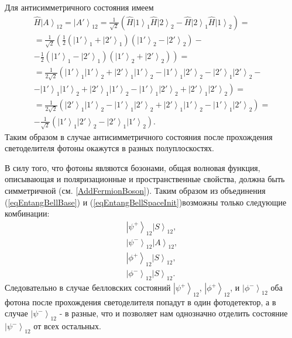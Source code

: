 Для антисимметричного состояния имеем
\begin{eqnarray}
\hat{H}\left|A\right>_{12} = \left|A'\right>_{12} = 
\frac{1}{\sqrt{2}}
\left(
\hat{H}\left|1\right>_1\hat{H}\left|2\right>_2 -
\hat{H}\left|2\right>_1\hat{H}\left|1\right>_2
\right) = 
\nonumber \\
=
\frac{1}{\sqrt{2}}
\left(
\frac{1}{2}
\left(\left|1'\right>_1 +
\left|2'\right>_1\right)
\left(\left|1'\right>_2 -
\left|2'\right>_2\right) -
\right.
\nonumber \\
- \left.
\frac{1}{2}
\left(\left|1'\right>_1 -
\left|2'\right>_1\right)
\left(\left|1'\right>_2 +
\left|2'\right>_2\right)
\right) = 
\nonumber \\
=
\frac{1}{2 \sqrt{2}}
\left(
\left|1'\right>_1 \left|1'\right>_2 +
\left|2'\right>_1 \left|1'\right>_2 -
\left|1'\right>_1 \left|2'\right>_2 -
\left|2'\right>_1 \left|2'\right>_2 -
\right. 
\nonumber \\
- \left.
\left|1'\right>_1 \left|1'\right>_2 +
\left|2'\right>_1 \left|1'\right>_2 -
\left|1'\right>_1 \left|2'\right>_2 +
\left|2'\right>_1 \left|2'\right>_2
\right) =
\nonumber \\
=
\frac{1}{2 \sqrt{2}}
\left(
\left|2'\right>_1 \left|1'\right>_2 
- \left|1'\right>_1 \left|2'\right>_2 
+ \left|2'\right>_1 \left|1'\right>_2 
- \left|1'\right>_1 \left|2'\right>_2
\right) = 
\nonumber \\
- \frac{1}{\sqrt{2}}
\left(
\left|1'\right>_1 \left|2'\right>_2 
- \left|2'\right>_1 \left|1'\right>_2 
\right).
\nonumber
\end{eqnarray}
Таким образом в случае антисимметричного состояния после прохождения
светоделителя фотоны окажутся в разных полуплоскостях.

В силу того, что фотоны являются бозонами, общая волновая функция,
описывающая и поляризационные и пространственные свойства,
должна быть симметричной \cite{bFeinman}
(см. \autoref{AddFermionBoson}). Таким образом из объединения 
(\ref{eqEntangBellBase}) и (\ref{eqEntangBellSpaceInit})возможны
только следующие комбинации:
\begin{eqnarray}
\left|\psi^{+}\right>_{12}\left|S\right>_{12},
\nonumber \\ 
\left|\psi^{-}\right>_{12}\left|A\right>_{12}, 
\nonumber \\ 
\left|\phi^{+}\right>_{12}\left|S\right>_{12}, 
\nonumber \\ 
\left|\phi^{-}\right>_{12}\left|S\right>_{12}.
\nonumber
\end{eqnarray}
Следовательно в случае белловских состояний 
$\left|\psi^{+}\right>_{12}$, $\left|\phi^{+}\right>_{12}$, и
$\left|\phi^{-}\right>_{12}$ оба фотона после прохождения
светоделителя попадут в один фотодетектор, а в случае
$\left|\psi^{-}\right>_{12}$ - в разные, что и позволяет нам
однозначно отделить состояние $\left|\psi^{-}\right>_{12}$ от всех
остальных. 

